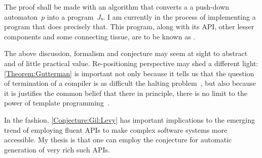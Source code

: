 The proof shall be made with an algorithm that converts a
 a push-down automaton~$p$ into a program~$Jₛ$.
I am currently in the process of implementing a program that
  does precisely that.
This program, along with its API, other lesser components and
  some connecting tissue, are to be known as \Self.

The above discussion, formalism and conjecture may seem at sight to abstract
  and of little practical value.
Re-positioning perspective may shed a different light:
\cref{Theorem:Gutterman} is important not only because it tells us
  that the question of termination of a \CC compiler is as difficult
  the halting problem~\cite{Halting}, but also because it
  is justifies the common belief that there in principle, there
  is no limit to the power of template programming~\cite{Templates:find:6:refs}.

In the fashion, \cref{Conjecture:Gil:Levy} has important
  implications to the emerging trend of employing fluent APIs
  to make complex software systems more accessible.
My thesis is that one can employ the conjecture for
  automatic generation of very rich such APIs.
